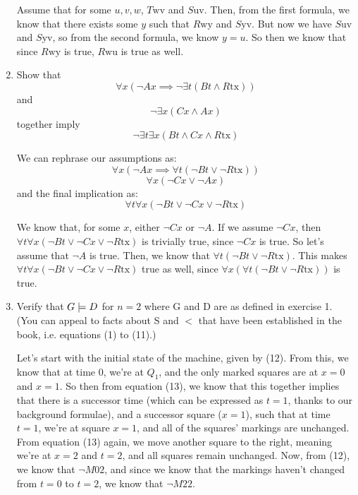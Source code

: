 \begin{enumerate}
    Assume that for some $u,v,w$, $T \text{wv}$ and $S \text{uv}$. Then, from the first formula, we know that there exists some $y$ such that $R \text{wy}$ and $S \text{yv}$. But now we have $S \text{uv}$ and $S \text{yv}$, so from the second formula, we know $y = u$. So then we know that since $R \text{wy}$ is true, $R \text {wu}$ is true as well.

  \item 
    \begin{question}
      Show that
      $$\forall x (\neg Ax \implies \neg \exists t (Bt \land R \text{tx}))$$
      and
      $$\neg \exists x (Cx \land Ax)$$
      together imply
      $$\neg \exists t \exists x (Bt \land Cx \land R \text{tx})$$
    \end{question}

    We can rephrase our assumptions as:
    $$\forall x (\neg Ax \implies \forall t (\neg Bt \lor \neg R \text{tx}))$$
    $$\forall x (\neg Cx \lor \neg Ax)$$
    and the final implication as:
    $$\forall t \forall x (\neg Bt \lor \neg Cx \lor \neg R \text{tx})$$

    We know that, for some $x$, either $\neg Cx$ or $\neg A$. If we assume $\neg Cx$, then $\forall t \forall x (\neg Bt \lor \neg Cx \lor \neg R \text{tx})$ is trivially true, since $\neg Cx$ is true. So let's assume that $\neg A$ is true. Then, we know that $\forall t (\neg Bt \lor \neg R \text{tx})$. This makes $\forall t \forall x (\neg Bt \lor \neg Cx \lor \neg R \text{tx})$ true as well, since $\forall x (\forall t (\neg Bt \lor \neg R \text{tx}))$ is true.

  \item
    \begin{question}
      Verify that $G \mathrel{|}\!= D$ for $n = 2$ where G and D are as defined in exercise 1. (You can appeal to facts about S and $<$ that have been established in the book, i.e. equations (1) to (11).)
    \end{question}

    Let's start with the initial state of the machine, given by (12). From this, we know that at time $0$, we're at $Q_1$, and the only marked squares are at $x=0$ and $x=1$. So then from equation (13), we know that this together implies that there is a successor time (which can be expressed as $t=1$, thanks to our background formulae), and a successor square ($x=1$), such that at time $t=1$, we're at square $x=1$, and all of the squares' markings are unchanged. From equation (13) again, we move another square to the right, meaning we're at $x=2$ and $t=2$, and all squares remain unchanged. Now, from (12), we know that $\neg M \text{02}$, and since we know that the markings haven't changed from $t=0$ to $t=2$, we know that $\neg M \text{22}$. \\


\end{enumerate}
